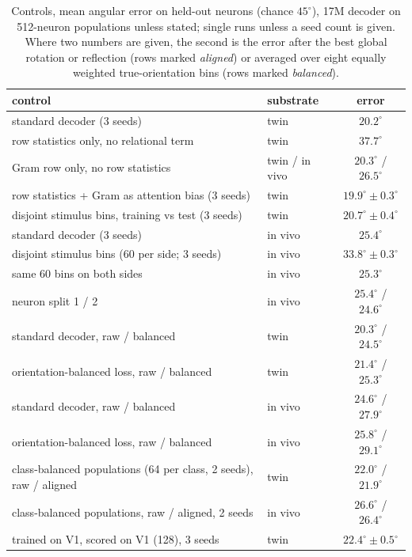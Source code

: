 \documentclass[11pt]{article}
\begin{document}
\begin{table}[htbp]
  \centering\footnotesize
  \caption{Controls, mean angular error on held-out neurons (chance $45^\circ$), 17M decoder on 512-neuron populations unless stated; single runs unless a seed count is given. Where two numbers are given, the second is the error after the best global rotation or reflection (rows marked \emph{aligned}) or averaged over eight equally weighted true-orientation bins (rows marked \emph{balanced}).}
  \label{tab:controls}
  \begin{tabular}{llc}
    \toprule
    control & substrate & error \\
    \midrule
    standard decoder (3 seeds) & twin & $20.2^\circ$ \\
    row statistics only, no relational term & twin & $37.7^\circ$ \\
    Gram row only, no row statistics & twin / in vivo & $20.3^\circ$ / $26.5^\circ$ \\
    row statistics + Gram as attention bias (3 seeds) & twin & $19.9^\circ \pm 0.3^\circ$ \\
    disjoint stimulus bins, training vs test (3 seeds) & twin & $20.7^\circ \pm 0.4^\circ$ \\
    standard decoder (3 seeds) & in vivo & $25.4^\circ$ \\
    disjoint stimulus bins (60 per side; 3 seeds) & in vivo & $33.8^\circ \pm 0.3^\circ$ \\
    same 60 bins on both sides & in vivo & $25.3^\circ$ \\
    neuron split 1 / 2 & in vivo & $25.4^\circ$ / $24.6^\circ$ \\
    standard decoder, raw / balanced & twin & $20.3^\circ$ / $24.5^\circ$ \\
    orientation-balanced loss, raw / balanced & twin & $21.4^\circ$ / $25.3^\circ$ \\
    standard decoder, raw / balanced & in vivo & $24.6^\circ$ / $27.9^\circ$ \\
    orientation-balanced loss, raw / balanced & in vivo & $25.8^\circ$ / $29.1^\circ$ \\
    class-balanced populations (64 per class, 2 seeds), raw / aligned & twin & $22.0^\circ$ / $21.9^\circ$ \\
    class-balanced populations, raw / aligned, 2 seeds & in vivo & $26.6^\circ$ / $26.4^\circ$ \\
    trained on V1, scored on V1 (128), 3 seeds & twin & $22.4^\circ \pm 0.5^\circ$ \\

\end{tabular}
\end{table}
\end{document}
